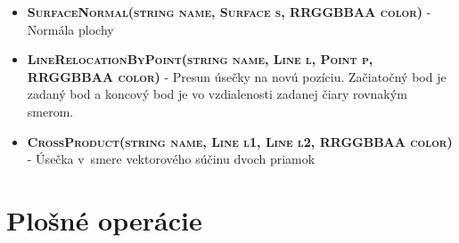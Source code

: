 \begin{itemize}
\item \textsc{\textbf{SurfaceNormal(string name, Surface s, RRGGBBAA color)}}  - Normála plochy%



\item \textsc{\textbf{LineRelocationByPoint(string name, Line l, Point p, RRGGBBAA color)}} - Presun úsečky na novú pozíciu. Začiatočný bod je zadaný bod a koncový bod je vo vzdialenosti zadanej čiary rovnakým smerom.%
\item \textsc{\textbf{CrossProduct(string name, Line l1, Line l2, RRGGBBAA color)}} - Úsečka v~smere vektorového súčinu dvoch priamok%

\end{itemize}




\section*{Plošné operácie}

